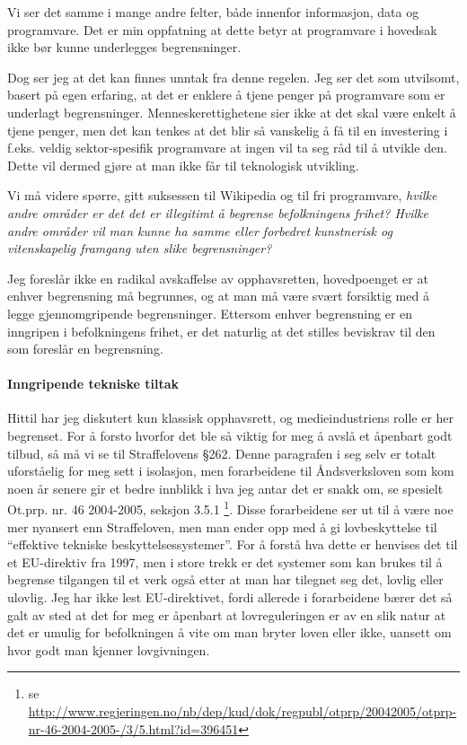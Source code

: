 \documentclass[11pt,norsk,a4paper]{article}
\begin{document}
Vi ser det samme i mange andre felter, både innenfor informasjon, data
og programvare. Det er min oppfatning at dette betyr at
programvare i hovedsak ikke bør kunne underlegges begrensninger.

Dog ser jeg at det kan finnes unntak fra denne regelen. Jeg ser det
som utvilsomt, basert på egen erfaring, at det er enklere å tjene
penger på programvare som er underlagt
begrensninger. Menneskerettighetene sier ikke at det skal være enkelt
å tjene penger, men det kan tenkes at det blir så vanskelig å få til
en investering i f.eks. veldig sektor-spesifik programvare at ingen
vil ta seg råd til å utvikle den. Dette vil dermed gjøre at man ikke
får til teknologisk utvikling.

Vi må videre spørre, gitt suksessen til Wikipedia og til fri
programvare, \emph{hvilke andre områder er det det er illegitimt å begrense
befolkningens frihet? Hvilke andre områder vil man kunne ha samme eller
forbedret kunstnerisk og vitenskapelig framgang uten slike begrensninger?}

Jeg foreslår ikke en radikal avskaffelse av opphavsretten,
hovedpoenget er at enhver begrensning må begrunnes, og at man må være
svært forsiktig med å legge gjennomgripende begrensninger. Ettersom
enhver begrensning er en inngripen i befolkningens frihet, er det
naturlig at det stilles beviskrav til den som foreslår en begrensning.  

\paragraph{Inngripende tekniske tiltak}

Hittil har jeg diskutert kun klassisk opphavsrett, og medieindustriens
rolle er her begrenset. For å forsto hvorfor det ble så viktig for meg
å avslå et åpenbart godt tilbud, så må vi se til Straffelovens
§262. Denne paragrafen i seg selv er totalt uforståelig for meg sett i
isolasjon, men forarbeidene til Åndsverksloven som kom noen år senere
gir et bedre innblikk i hva jeg antar det er snakk om, se spesielt
Ot.prp. nr. 46 2004-2005, seksjon 3.5.1 \footnote{se
  \url{http://www.regjeringen.no/nb/dep/kud/dok/regpubl/otprp/20042005/otprp-nr-46-2004-2005-/3/5.html?id=396451}}. 
Disse forarbeidene ser ut til å være noe mer nyansert enn
Straffeloven, men man ender opp med å gi lovbeskyttelse til
``effektive tekniske beskyttelsessystemer''. For å forstå hva dette er
henvises det til et EU-direktiv fra 1997, men i store trekk er det
systemer som kan brukes til å begrense tilgangen til et verk også
etter at man har tilegnet seg det, lovlig eller ulovlig. Jeg har ikke
lest EU-direktivet, fordi allerede i forarbeidene bærer det så galt av
sted at det for meg er åpenbart at lovreguleringen er av en slik natur
at det er umulig for befolkningen å vite om man bryter loven eller
ikke, uansett om hvor godt man kjenner lovgivningen. 
\end{document}
